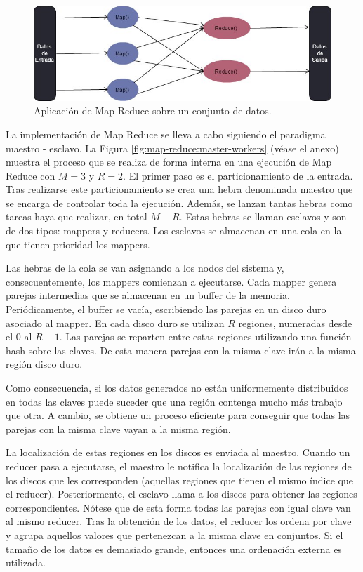 \documentclass[10pt]{article}
\begin{document}
		\begin{figure}[H]
			\centering
			\includegraphics[width=14cm]{./images/MapReduce.jpg}
			\caption{Aplicación de Map Reduce sobre un conjunto de datos.} 
			\label{fig:map-reduce}
		\end{figure}

		La implementación de Map Reduce se lleva a cabo siguiendo el paradigma maestro - esclavo. La Figura \ref{fig:map-reduce:master-workers} (véase el anexo) muestra el proceso que se realiza de forma interna en una ejecución de Map Reduce con $M=3$ y $R=2$. El primer paso es el particionamiento de la entrada. Tras realizarse este particionamiento se crea una hebra denominada maestro que se encarga de controlar toda la ejecución. Además, se lanzan tantas hebras como tareas haya que realizar, en total $M+R$. Estas hebras se llaman esclavos y son de dos tipos: mappers y reducers. Los esclavos se almacenan en una cola en la que tienen prioridad los mappers.
		
		Las hebras de la cola se van asignando a los nodos del sistema y, consecuentemente, los mappers comienzan a ejecutarse. Cada mapper genera parejas intermedias que se almacenan en un buffer de la memoria. Periódicamente, el buffer se vacía, escribiendo las parejas en un disco duro asociado al mapper. En cada disco duro se utilizan $R$ regiones, numeradas desde el $0$ al $R-1$. Las parejas se reparten entre estas regiones utilizando una función hash sobre las claves. De esta manera parejas con la misma clave irán a la misma región disco duro. 

		Como consecuencia, si los datos generados no están uniformemente distribuidos en todas las claves puede suceder que una región contenga mucho más trabajo que otra. A cambio, se obtiene un proceso eficiente para conseguir que todas las parejas con la misma clave vayan a la misma región.
		
		La localización de estas regiones en los discos es enviada al maestro. Cuando un reducer pasa a ejecutarse, el maestro le notifica la localización de las regiones de los discos que les corresponden (aquellas regiones que tienen el mismo índice que el reducer). Posteriormente, el esclavo llama a los discos para obtener las regiones correspondientes. Nótese que de esta forma todas las parejas con igual clave van al mismo reducer. Tras la obtención de los datos, el reducer los ordena por clave y agrupa aquellos valores que pertenezcan a la misma clave en conjuntos. Si el tamaño de los datos es demasiado grande, entonces una ordenación externa es utilizada.
		
\end{document}
